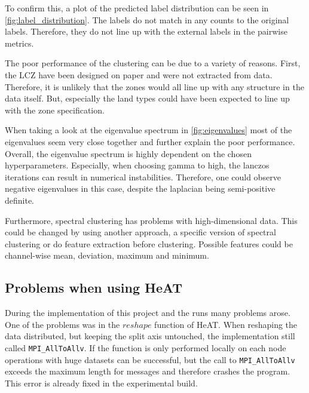 To confirm this, a plot of the predicted label distribution can be seen in \cref{fig:label_distribution}.
The labels do not match in any counts to the original labels. Therefore, they do not line up with the external labels
in the pairwise metrics.

The poor performance of the clustering can be due to a variety of reasons.
First, the \gls{LCZ} have been designed on paper and were not extracted from data. Therefore, it is unlikely that
the zones would all line up with any structure in the data itself.
But, especially the land types could have been expected to line up with the zone specification.

When taking a look at the eigenvalue spectrum in \cref{fig:eigenvalues} most of the eigenvalues seem very close together and
further explain the poor performance. Overall, the eigenvalue spectrum is highly dependent on the chosen hyperparameters.
Especially, when choosing gamma to high, the lanczos iterations can result in numerical instabilities.
Therefore, one could observe negative eigenvalues in this case, despite the laplacian being semi-positive definite.

Furthermore, spectral clustering has problems with high-dimensional data. This could be changed by using another approach, a specific version of spectral clustering
or do feature extraction before clustering. Possible features could be channel-wise mean, deviation, maximum and minimum.

\subsection{Problems when using HeAT}
\label{subsec:problems_when_using_heat}
During the implementation of this project and the runs many problems arose.
One of the problems was in the \(reshape\) function of \gls{HeAT}.
When reshaping the data distributed, but keeping the split axis untouched, the implementation still called \lstinline{MPI_AllToAllv}.
If the function is only performed locally on each node operations with huge datasets can be successful, but the call to \lstinline{MPI_AllToAllv} exceeds the maximum length
for messages and therefore crashes the program.
This error is already fixed in the experimental build.

